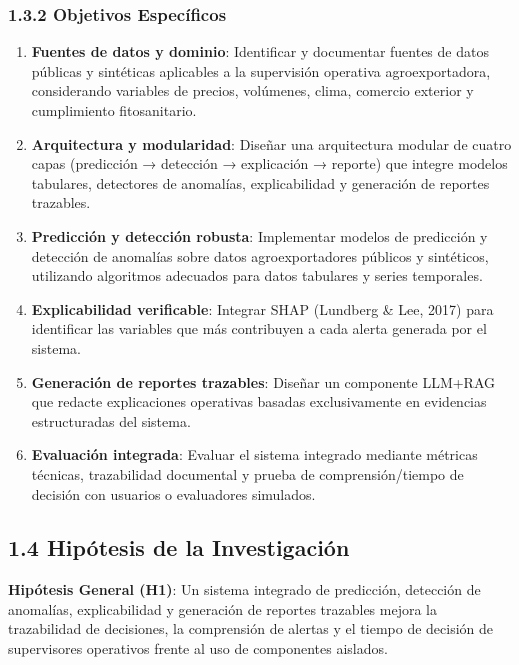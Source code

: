 \subsubsection{1.3.2 Objetivos
Específicos}\label{objetivos-especuxedficos}

\begin{enumerate}
\def\labelenumi{\arabic{enumi}.}
\item
  \textbf{Fuentes de datos y dominio}: Identificar y documentar fuentes
  de datos públicas y sintéticas aplicables a la supervisión operativa
  agroexportadora, considerando variables de precios, volúmenes, clima,
  comercio exterior y cumplimiento fitosanitario.
\item
  \textbf{Arquitectura y modularidad}: Diseñar una arquitectura modular
  de cuatro capas (predicción → detección → explicación → reporte) que
  integre modelos tabulares, detectores de anomalías, explicabilidad y
  generación de reportes trazables.
\item
  \textbf{Predicción y detección robusta}: Implementar modelos de
  predicción y detección de anomalías sobre datos agroexportadores
  públicos y sintéticos, utilizando algoritmos adecuados para datos
  tabulares y series temporales.
\item
  \textbf{Explicabilidad verificable}: Integrar SHAP (Lundberg \& Lee,
  2017) para identificar las variables que más contribuyen a cada alerta
  generada por el sistema.
\item
  \textbf{Generación de reportes trazables}: Diseñar un componente
  LLM+RAG que redacte explicaciones operativas basadas exclusivamente en
  evidencias estructuradas del sistema.
\item
  \textbf{Evaluación integrada}: Evaluar el sistema integrado mediante
  métricas técnicas, trazabilidad documental y prueba de
  comprensión/tiempo de decisión con usuarios o evaluadores simulados.
\end{enumerate}

\subsection{1.4 Hipótesis de la
Investigación}\label{hipuxf3tesis-de-la-investigaciuxf3n}

\textbf{Hipótesis General (H1)}: Un sistema integrado de predicción,
detección de anomalías, explicabilidad y generación de reportes
trazables mejora la trazabilidad de decisiones, la comprensión de
alertas y el tiempo de decisión de supervisores operativos frente al uso
de componentes aislados.

